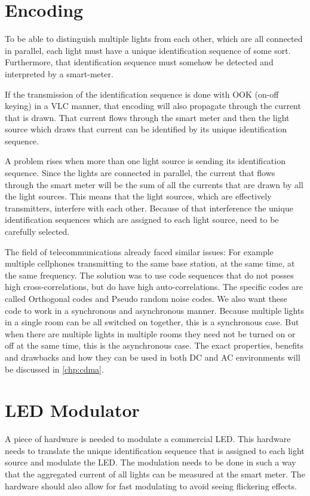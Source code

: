 	\section{Encoding}

	To be able to distinguish multiple lights from each other, which are all connected in parallel, each light must have a unique identification sequence of some sort.
	Furthermore, that identification sequence must somehow be detected and interpreted by a smart-meter.


	If the transmission of the identification sequence is done with OOK (on-off keying) in a VLC manner, that encoding will also propagate through the current that is drawn.
	That current flows through the smart meter and then the light source which draws that current can be identified by its unique identification sequence. 


	A problem rises when more than one light source is sending its identification sequence.
	Since the lights are connected in parallel, the current that flows through the smart meter will be the sum of all the currents that are drawn by all the light sources.
	This means that the light sources, which are effectively transmitters, interfere with each other.
	Because of that interference the unique identification sequences which are assigned to each light source, need to be carefully selected.


	The field of telecommunications already faced similar issues: For example multiple cellphones transmitting to the same base station, at the same time, at the same frequency. 
	The solution was to use code sequences that do not posses high cross-correlations, but do have high auto-correlations.
	The specific codes are called Orthogonal codes and Pseudo random noise codes.
	We also want these code to work in a synchronous and asynchronous manner.
	Because multiple lights in a single room can be all switched on together, this is a synchronous case.
	But when there are multiple lights in multiple rooms they need not be turned on or off at the same time, this is the asynchronous case.
	The exact properties, benefits and drawbacks and how they can be used in both DC and AC environments will be discussed in \autoref{chp:cdma}.




	\section{LED Modulator}

	A piece of hardware is needed to modulate a commercial LED.
	This hardware needs to translate the unique identification sequence that is assigned to each light source and modulate the LED.
	The modulation needs to be done in such a way that the aggregated current of all lights can be measured at the smart meter.  
	The hardware should also allow for fast modulating to avoid seeing flickering effects.


